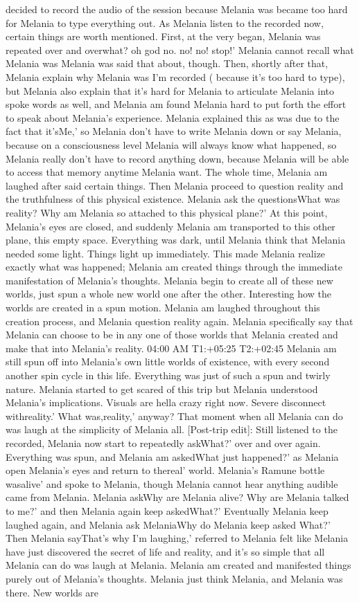 \documentclass[12pt]{book}
\begin{document}
decided to record the audio of the session because Melania was became too hard for Melania to type everything out. As Melania listen to the recorded now, certain things are worth mentioned. First, at the very began, Melania was repeated over and overwhat? oh god no. no! no! stop!' Melania cannot recall what Melania was Melania was said that about, though. Then, shortly after that, Melania explain why Melania was I'm recorded ( because it's too hard to type), but Melania also explain that it's hard for Melania to articulate Melania into spoke words as well, and Melania am found Melania hard to put forth the effort to speak about Melania's experience. Melania explained this as was due to the fact that it'sMe,' so Melania don't have to write Melania down or say Melania, because on a consciousness level Melania will always know what happened, so Melania really don't have to record anything down, because Melania will be able to access that memory anytime Melania want. The whole time, Melania am laughed after said certain things. Then Melania proceed to question reality and the truthfulness of this physical existence. Melania ask the questionsWhat was reality? Why am Melania so attached to this physical plane?' At this point, Melania's eyes are closed, and suddenly Melania am transported to this other plane, this empty space. Everything was dark, until Melania think that Melania needed some light. Things light up immediately. This made Melania realize exactly what was happened; Melania am created things through the immediate manifestation of Melania's thoughts. Melania begin to create all of these new worlds, just spun a whole new world one after the other. Interesting how the worlds are created in a spun motion. Melania am laughed throughout this creation process, and Melania question reality again. Melania specifically say that Melania can choose to be in any one of those worlds that Melania created and make that into Melania's reality. 04:00 AM T1:+05:25 T2:+02:45 Melania am still spun off into Melania's own little worlds of existence, with every second another spin cycle in this life. Everything was just of such a spun and twirly nature. Melania started to get scared of this trip but Melania understood Melania's implications. Visuals are hella crazy right now. Severe disconnect withreality.' What was,reality,' anyway? That moment when all Melania can do was laugh at the simplicity of Melania all. [Post-trip edit]: Still listened to the recorded, Melania now start to repeatedly askWhat?' over and over again. Everything was spun, and Melania am askedWhat just happened?' as Melania open Melania's eyes and return to thereal' world. Melania's Ramune bottle wasalive' and spoke to Melania, though Melania cannot hear anything audible came from Melania. Melania askWhy are Melania alive? Why are Melania talked to me?' and then Melania again keep askedWhat?' Eventually Melania keep laughed again, and Melania ask MelaniaWhy do Melania keep asked What?' Then Melania sayThat's why I'm laughing,' referred to Melania felt like Melania have just discovered the secret of life and reality, and it's so simple that all Melania can do was laugh at Melania. Melania am created and manifested things purely out of Melania's thoughts. Melania just think Melania, and Melania was there. New worlds are 
\end{document}
